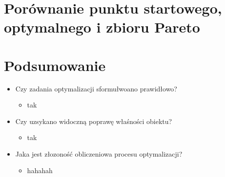 \documentclass{article}
\begin{document}
\section{Porównanie punktu startowego, optymalnego i zbioru Pareto}
\section{Podsumowanie}
\begin{itemize}
	\item Czy zadania optymalizacji sformułwoano prawidłowo?
	      \begin{itemize}
		      \item tak
	      \end{itemize}
	\item Czy uzsykano widoczną poprawę właśności obiektu?
	      \begin{itemize}
		      \item tak
	      \end{itemize}

	\item Jaka jest złozoność obliczeniowa procesu optymalizacji?
	      \begin{itemize}
		      \item hahahah
	      \end{itemize}

\end{itemize}
\end{document}
